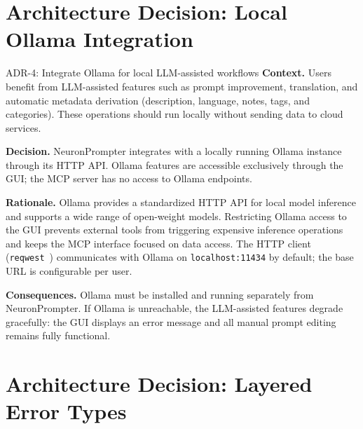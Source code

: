 \documentclass[a4paper, 11pt, oneside]{report}
\begin{document}
\section{Architecture Decision: Local Ollama Integration}
\label{sec:adr-ollama}

\begin{adrbox}{ADR-4: Integrate Ollama for local LLM-assisted workflows}
\textbf{Context.}\quad
Users benefit from LLM-assisted features such as prompt improvement,
translation, and automatic metadata derivation (description, language,
notes, tags, and categories).  These operations should run locally without sending
data to cloud services.

\textbf{Decision.}\quad
NeuronPrompter integrates with a locally running Ollama
instance~\cite{ollama} through its HTTP API.  Ollama features are
accessible exclusively through the GUI; the MCP server has no access to
Ollama endpoints.

\textbf{Rationale.}\quad
Ollama provides a standardized HTTP API for local model inference and
supports a wide range of open-weight models.  Restricting Ollama access to
the GUI prevents external tools from triggering expensive inference
operations and keeps the MCP interface focused on data access.  The HTTP
client (\texttt{reqwest}~\cite{reqwest}) communicates with Ollama on
\texttt{localhost:11434} by default; the base URL is configurable per user.

\textbf{Consequences.}\quad
Ollama must be installed and running separately from NeuronPrompter.  If
Ollama is unreachable, the LLM-assisted features degrade gracefully: the
GUI displays an error message and all manual prompt editing remains fully
functional.
\end{adrbox}


\section{Architecture Decision: Layered Error Types}
\label{sec:adr-errors}
\end{document}
